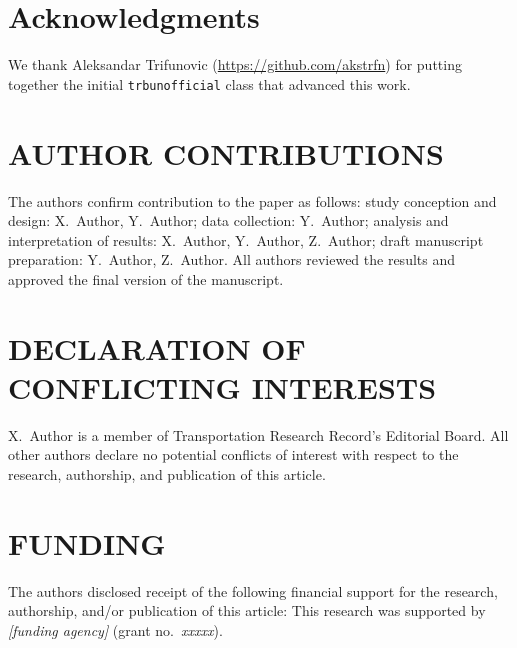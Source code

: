 \documentclass[numbered]{trbunofficial}
\begin{document}
\section{Acknowledgments}
We thank Aleksandar Trifunovic (\url{https://github.com/akstrfn}) for putting together the initial \verb|trbunofficial| class that advanced this work.

\section*{AUTHOR CONTRIBUTIONS}
The authors confirm contribution to the paper as follows: 
study conception and design: X.~Author, Y.~Author; 
data collection: Y.~Author; 
analysis and interpretation of results: X.~Author, Y.~Author, Z.~Author; 
draft manuscript preparation: Y.~Author, Z.~Author. 
All authors reviewed the results and approved the final version of the manuscript.

\section*{DECLARATION OF CONFLICTING INTERESTS}
X.~Author is a member of Transportation Research Record’s Editorial Board.  All other authors declare no potential conflicts of interest with respect to the research, authorship, and publication of this article.



\section*{FUNDING}
The authors disclosed receipt of the following financial support 
for the research, authorship, and/or publication of this article: 
This research was supported by \emph{[funding agency]} (grant no.~\emph{xxxxx}).



\newpage


\end{document}
